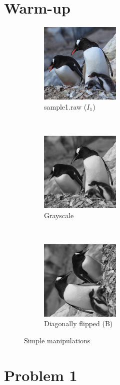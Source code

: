 \documentclass[12pt]{article}
\begin{document}
\section*{Warm-up}
\begin{figure}[ht!]
    \centering
    \begin{subfigure}[t]{0.3\textwidth}
        \centering
        \includegraphics[height=1.5in]{images/I1}
        \caption{sample1.raw ($I_1$)}
    \end{subfigure}%
    ~ 
    \begin{subfigure}[t]{0.3\textwidth}
        \centering
        \includegraphics[height=1.5in]{images/I1_gray}
        \caption{Grayscale}
    \end{subfigure}%
    ~
    \begin{subfigure}[t]{0.3\textwidth}
        \centering
        \includegraphics[height=1.5in]{images/B}
        \caption{Diagonally flipped (B)}
    \end{subfigure}
    \caption{Simple manipulations}
\end{figure}

\section*{Problem 1}
\end{document}
